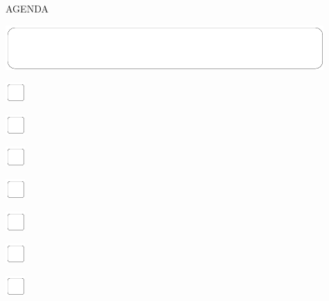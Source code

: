 \documentclass[11pt,titlepage]{article}
\begin{document}
\pagebreak

\small
\hfill AGENDA

\vspace{6mm}

\noindent
\includegraphics[]{mediumbox.pdf}

\vspace{15mm}

\noindent
\includegraphics[]{checkbox-4mm.pdf}

\vspace{10mm}

\noindent
\includegraphics[]{checkbox-4mm.pdf}

\vspace{10mm}

\noindent
\includegraphics[]{checkbox-4mm.pdf}

\vspace{10mm}

\noindent
\includegraphics[]{checkbox-4mm.pdf}

\vspace{10mm}

\noindent
\includegraphics[]{checkbox-4mm.pdf}

\vspace{10mm}

\noindent
\includegraphics[]{checkbox-4mm.pdf}

\vspace{10mm}

\noindent
\includegraphics[]{checkbox-4mm.pdf}
\end{document}
